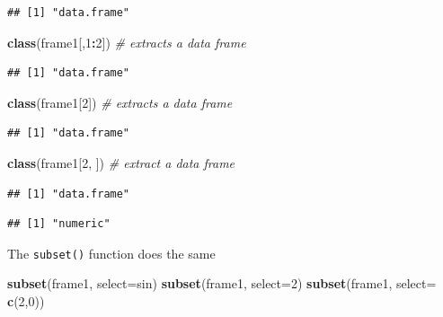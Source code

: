 \documentclass[]{book}
\newenvironment{Shaded}{\begin{snugshade}}{\end{snugshade}}
\newcommand{\KeywordTok}[1]{\textcolor[rgb]{0.13,0.29,0.53}{\textbf{#1}}}
\newcommand{\DataTypeTok}[1]{\textcolor[rgb]{0.13,0.29,0.53}{#1}}
\newcommand{\DecValTok}[1]{\textcolor[rgb]{0.00,0.00,0.81}{#1}}
\newcommand{\CommentTok}[1]{\textcolor[rgb]{0.56,0.35,0.01}{\textit{#1}}}
\newcommand{\OperatorTok}[1]{\textcolor[rgb]{0.81,0.36,0.00}{\textbf{#1}}}
\newcommand{\NormalTok}[1]{#1}
\theoremstyle{definition}
\theoremstyle{definition}
\theoremstyle{definition}
\theoremstyle{remark}
\begin{document}
\begin{verbatim}
## [1] "data.frame"
\end{verbatim}

\begin{Shaded}
\begin{Highlighting}[]
\KeywordTok{class}\NormalTok{(frame1[,}\DecValTok{1}\OperatorTok{:}\DecValTok{2}\NormalTok{])  }\CommentTok{# extracts a data frame}
\end{Highlighting}
\end{Shaded}

\begin{verbatim}
## [1] "data.frame"
\end{verbatim}

\begin{Shaded}
\begin{Highlighting}[]
\KeywordTok{class}\NormalTok{(frame1[}\DecValTok{2}\NormalTok{])  }\CommentTok{# extracts a data frame}
\end{Highlighting}
\end{Shaded}

\begin{verbatim}
## [1] "data.frame"
\end{verbatim}

\begin{Shaded}
\begin{Highlighting}[]
\KeywordTok{class}\NormalTok{(frame1[}\DecValTok{2}\NormalTok{, ])  }\CommentTok{# extract a data frame}
\end{Highlighting}
\end{Shaded}

\begin{verbatim}
## [1] "data.frame"
\end{verbatim}

\begin{Shaded}
\end{Shaded}

\begin{verbatim}
## [1] "numeric"
\end{verbatim}

The \texttt{subset()} function does the same

\begin{Shaded}
\begin{Highlighting}[]
\KeywordTok{subset}\NormalTok{(frame1, }\DataTypeTok{select=}\NormalTok{sin) }
\KeywordTok{subset}\NormalTok{(frame1, }\DataTypeTok{select=}\DecValTok{2}\NormalTok{)}
\KeywordTok{subset}\NormalTok{(frame1, }\DataTypeTok{select=} \KeywordTok{c}\NormalTok{(}\DecValTok{2}\NormalTok{,}\DecValTok{0}\NormalTok{))}
\end{Highlighting}
\end{Shaded}
\end{document}

